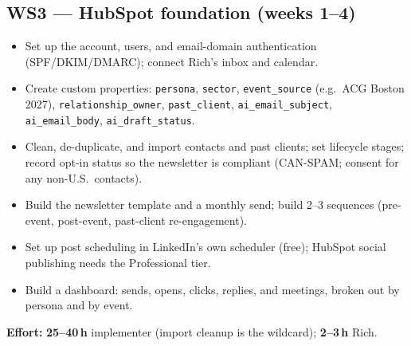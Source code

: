 \documentclass[11pt]{article}
\newcommand{\hrs}[1]{\textbf{#1\,h}}
\begin{document}
\subsection{WS3 --- HubSpot foundation (weeks 1--4)}
\begin{itemize}
  \item Set up the account, users, and email-domain authentication (SPF/DKIM/DMARC); connect
  Rich's inbox and calendar.
  \item Create custom properties: \texttt{persona}, \texttt{sector}, \texttt{event\_source}
  (e.g.\ ACG Boston 2027), \texttt{relationship\_owner}, \texttt{past\_client},
  \texttt{ai\_email\_subject}, \texttt{ai\_email\_body}, \texttt{ai\_draft\_status}.
  \item Clean, de-duplicate, and import contacts and past clients; set lifecycle stages; record
  opt-in status so the newsletter is compliant (CAN-SPAM; consent for any non-U.S.\ contacts).
  \item Build the newsletter template and a monthly send; build 2--3 sequences (pre-event,
  post-event, past-client re-engagement).
  \item Set up post scheduling in LinkedIn's own scheduler (free); HubSpot social publishing
  needs the Professional tier.
  \item Build a dashboard: sends, opens, clicks, replies, and meetings, broken out by persona and
  by event.
\end{itemize}
\textbf{Effort:} \hrs{25--40} implementer (import cleanup is the wildcard); \hrs{2--3} Rich.
\end{document}
